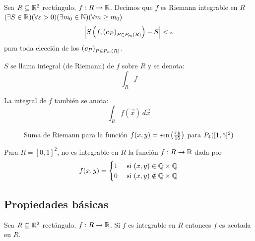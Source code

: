 \begin{definicion}

Sea $ R \subseteq \mathbb{R}^2 $ rect\'angulo, $ f:R \to \mathbb{R} $. Decimos que $f$ es Riemann integrable  en $R$ \tssi{} $ (\exists S \in \mathbb{R}) (\forall \varepsilon > 0) (\exists m_0\in \mathbb{N}) (\forall m \geq m_0)$
\[ \left\lvert S\left(f, {(\boldsymbol{c}_P)}_{P \in P_{m}(R)}\right) - S \right\rvert < \varepsilon \]
para toda elecci\'on de los $ {(\boldsymbol{c}_P)}_{P \in P_{m}(R)} $.

$S$ se llama integral (de Riemann)  de $f$ sobre $R$ y se denota:
\[ \int_R f \]
\end{definicion}

La integral de $f$ tambi\'en se anota:
\[ \int_R f(\vec{x})\,d\vec{x} \]

\begin{figure}[H]\label{fig:Riemann} 
   \centering
   
   \caption{Suma de Riemann para la funci\'on $f(x,y)=\text{sen}\left(\frac{xy}{15}\right)$ para $ P_{4}([1,5]^2)$}
 \end{figure}

\begin{ejemplo}
Para $ R = [0,1]^2 $, no es integrable en $ R $ la funci\'on $ f : R\to \mathbb{R} $ dada por
    \[f(x,y) =
    \begin{cases}
        1& \text{ si } (x,y) \in \mathbb{Q} \times \mathbb{Q} \\
        0& \text{ si } (x,y) \notin \mathbb{Q} \times \mathbb{Q}
    \end{cases}
    \]
\end{ejemplo}

\subsection{Propiedades b\'asicas}

\begin{proposicion}
Sea $ R \subseteq \mathbb{R}^2 $ rect\'angulo, $ f:R \to \mathbb{R} $. Si $ f $ es integrable en $ R $ entonces $ f $ es acotada en $ R $.
\end{proposicion}

